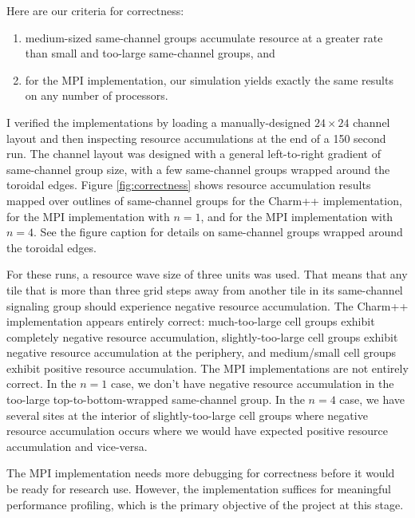 Here are our criteria for correctness:
\begin{enumerate}
\item medium-sized same-channel groups accumulate resource at a greater rate than small and too-large same-channel groups, and
\item for the MPI implementation, our simulation yields exactly the same results on any number of processors.
\end{enumerate}

I verified the implementations by loading a manually-designed $24 \times 24$ channel layout and then inspecting resource accumulations at the end of a 150 second run.
The channel layout was designed with a general left-to-right gradient of same-channel group size, with a few same-channel groups wrapped around the toroidal edges.
Figure \ref{fig:correctness} shows resource accumulation results mapped over outlines of same-channel groups for the Charm++ implementation, for the MPI implementation with $n=1$, and for the MPI implementation with $n=4$.
See the figure caption for details on same-channel groups wrapped around the toroidal edges.

For these runs, a resource wave size of three units was used.
That means that any tile that is more than three grid steps away from another tile in its same-channel signaling group should experience negative resource accumulation.
The Charm++ implementation appears entirely correct: much-too-large cell groups exhibit completely negative resource accumulation, slightly-too-large cell groups exhibit negative resource accumulation at the periphery, and medium/small cell groups exhibit positive resource accumulation.
The MPI implementations are not entirely correct.
In the $n=1$ case, we don't have negative resource accumulation in the too-large top-to-bottom-wrapped same-channel group.
In the $n=4$ case, we have several sites at the interior of slightly-too-large cell groups where negative resource accumulation occurs where we would have expected positive resource accumulation and vice-versa.

The MPI implementation needs more debugging for correctness before it would be ready for research use.
However, the implementation suffices for meaningful performance profiling, which is the primary objective of the project at this stage.
